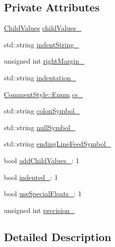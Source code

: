 \subsection*{Private Attributes}
\begin{DoxyCompactItemize}
\item 
\hyperlink{struct_json_1_1_built_styled_stream_writer_a8356597862a354bcd55a7cb6e0512899}{Child\+Values} \hyperlink{struct_json_1_1_built_styled_stream_writer_a47d562d7874c5b1e68995bd62f575792}{child\+Values\+\_\+}
\item 
std\+::string \hyperlink{struct_json_1_1_built_styled_stream_writer_a2abfd5beb7f33adc3f690ce4f618aa2f}{indent\+String\+\_\+}
\item 
unsigned int \hyperlink{struct_json_1_1_built_styled_stream_writer_a06a51521ccae20397f52fe3036edc602}{right\+Margin\+\_\+}
\item 
std\+::string \hyperlink{struct_json_1_1_built_styled_stream_writer_ab1d7561ca0f480cb46cc113e1005e8ac}{indentation\+\_\+}
\item 
\hyperlink{struct_json_1_1_comment_style_a51fc08f3518fd81eba12f340d19a3d0c}{Comment\+Style\+::\+Enum} \hyperlink{struct_json_1_1_built_styled_stream_writer_a89a9c76c7531143b52785861ba21c1d4}{cs\+\_\+}
\item 
std\+::string \hyperlink{struct_json_1_1_built_styled_stream_writer_ac28b111b1c3ecc1ea6d981c8530ceca4}{colon\+Symbol\+\_\+}
\item 
std\+::string \hyperlink{struct_json_1_1_built_styled_stream_writer_a238a8f4737c9835af78ea80cc4f12658}{null\+Symbol\+\_\+}
\item 
std\+::string \hyperlink{struct_json_1_1_built_styled_stream_writer_a85a8c0e3c9deb2503d497f61bc0da74c}{ending\+Line\+Feed\+Symbol\+\_\+}
\item 
bool \hyperlink{struct_json_1_1_built_styled_stream_writer_abed9cc31da503b48798e7cea68c42e16}{add\+Child\+Values\+\_\+}\+: 1
\item 
bool \hyperlink{struct_json_1_1_built_styled_stream_writer_a6aa0ad023e623f600103631a6bca6d10}{indented\+\_\+}\+: 1
\item 
bool \hyperlink{struct_json_1_1_built_styled_stream_writer_a6f1b8694b4eb17ab8c34f6d6dd8c8a4a}{use\+Special\+Floats\+\_\+}\+: 1
\item 
unsigned int \hyperlink{struct_json_1_1_built_styled_stream_writer_a6373d8d0ae4741b64e3904e4db0eef46}{precision\+\_\+}
\end{DoxyCompactItemize}


\subsection{Detailed Description}


